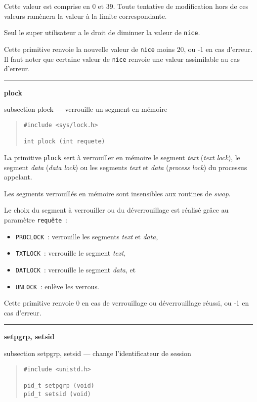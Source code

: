\documentclass [twoside] {report}
\newcommand {\primitive} [1]
    {
	\phantomsection
	{\large \bf #1}
	\addcontentsline {toc} {subsection} {#1}
    }
\newcommand {\separation}
    {
	\vspace {5mm}
	\nopagebreak
	\hrule
    }
\begin{document}
Cette valeur est comprise en 0 et 39. Toute
tentative de modification hors de ces valeurs
ramènera la valeur à la limite correspondante.

Seul le super utilisateur a le droit de diminuer
la valeur de {\tt nice}.

Cette primitive renvoie la nouvelle valeur de
{\tt nice} moins 20, ou -1 en cas d'erreur. Il faut
noter que certaine valeur de {\tt nice} renvoie une
valeur assimilable au cas d'erreur.




\separation
\primitive {plock} --- verrouille un segment en mémoire

\begin {quote}
\begin {verbatim}
#include <sys/lock.h>

int plock (int requete)
\end{verbatim}
\end {quote}

La primitive {\tt plock} sert à verrouiller en
mémoire le segment {\it text} ({\it text lock}), le
segment {\it data} ({\it data lock}) ou les segments
{\it text} et {\it data} ({\it process lock}) du processus
appelant.

Les segments verrouillés en mémoire sont
insensibles aux routines de {\it swap}.

Le choix du segment à verrouiller ou du
déverrouillage est réalisé grâce au paramètre
{\tt requête}~:

\begin {itemize}
    \item {\tt PROCLOCK}~: verrouille les segments {\it text} et {\it data},
    \item {\tt TXTLOCK}~: verrouille le segment {\it text},
    \item {\tt DATLOCK}~: verrouille le segment {\it data}, et
    \item {\tt UNLOCK}~: enlève les verrous.
\end {itemize}

Cette primitive renvoie 0 en cas de verrouillage
ou déverrouillage réussi, ou -1 en cas d'erreur.




\separation
\primitive {setpgrp, setsid} --- change l'identificateur de session

\begin {quote}
\begin {verbatim}
#include <unistd.h>

pid_t setpgrp (void)
pid_t setsid (void)
\end{verbatim}
\end {quote}
\end{document}
